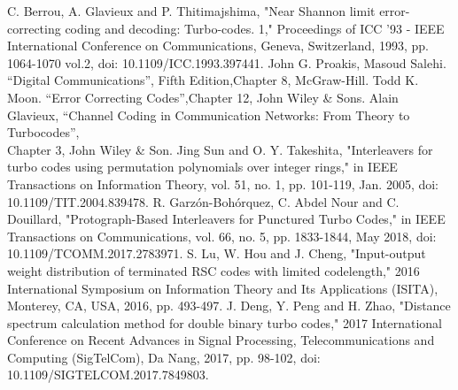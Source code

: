 \begin{thebibliography}{99}
  C. Berrou, A. Glavieux and P. Thitimajshima, "Near Shannon limit error-correcting coding and decoding: Turbo-codes. 1," Proceedings of ICC '93 - IEEE International Conference on Communications, Geneva, Switzerland, 1993, pp. 1064-1070 vol.2, doi: 10.1109/ICC.1993.397441.
 John G. Proakis, Masoud Salehi. ``Digital Communications'', 
Fifth Edition,Chapter 8, McGraw-Hill.
 Todd K. Moon. ``Error Correcting Codes'',Chapter 12, John Wiley \& Sons.
Alain Glavieux, ``Channel Coding in Communication Networks: From Theory to Turbocodes'',\\ Chapter 3, John Wiley \& Son. 
 Jing Sun and O. Y. Takeshita, "Interleavers for turbo codes using permutation polynomials over integer rings," in IEEE Transactions on Information Theory, vol. 51, no. 1, pp. 101-119, Jan. 2005, doi: 10.1109/TIT.2004.839478.
R. Garzón-Bohórquez, C. Abdel Nour and C. Douillard, "Protograph-Based Interleavers for Punctured Turbo Codes," in IEEE Transactions on Communications, vol. 66, no. 5, pp. 1833-1844, May 2018, doi: 10.1109/TCOMM.2017.2783971.
S. Lu, W. Hou and J. Cheng, "Input-output weight distribution of terminated RSC codes with limited codelength," 2016 International Symposium on Information Theory and Its Applications (ISITA), Monterey, CA, USA, 2016, pp. 493-497.
J. Deng, Y. Peng and H. Zhao, "Distance spectrum calculation method for double binary turbo codes," 2017 International Conference on Recent Advances in Signal Processing, Telecommunications and Computing (SigTelCom), Da Nang, 2017, pp. 98-102, doi: 10.1109/SIGTELCOM.2017.7849803.
\end{thebibliography}